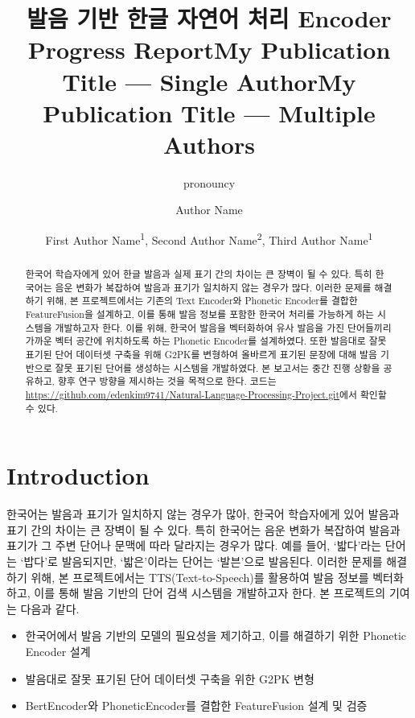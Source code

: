 \documentclass[letterpaper]{article} %
\title{발음 기반 한글 자연어 처리 Encoder \\
        Progress Report}
\author{
    pronouncy
}
\title{My Publication Title --- Single Author}
\author {
    Author Name
}
\title{My Publication Title --- Multiple Authors}
\author {
    First Author Name\textsuperscript{\rm 1},
    Second Author Name\textsuperscript{\rm 2},
    Third Author Name\textsuperscript{\rm 1}
}
\begin{document}
\maketitle

\begin{abstract}
한국어 학습자에게 있어 한글 발음과 실제 표기 간의 차이는 큰 장벽이 될 수 있다. 
특히 한국어는 음운 변화가 복잡하여 발음과 표기가 일치하지 않는 경우가 많다. 이러한 문제를 해결하기 위해, 본 프로젝트에서는 기존의 Text Encoder와 Phonetic Encoder를 결합한 FeatureFusion을 설계하고, 이를 통해 발음 정보를 포함한 한국어 처리를 가능하게 하는 시스템을 개발하고자 한다. 
이를 위해, 한국어 발음을 벡터화하여 유사 발음을 가진 단어들끼리 가까운 벡터 공간에 위치하도록 하는 Phonetic Encoder를 설계하였다. 
또한 발음대로 잘못 표기된 단어 데이터셋 구축을 위해 G2PK\cite{park2019g2pk}를 변형하여 올바르게 표기된 문장에 대해 발음 기반으로 잘못 표기된 단어를 생성하는 시스템을 개발하였다.
본 보고서는 중간 진행 상황을 공유하고, 향후 연구 방향을 제시하는 것을 목적으로 한다. 코드는 \url{https://github.com/edenkim9741/Natural-Language-Processing-Project.git}에서 확인할 수 있다.
\end{abstract}

%

\section{Introduction}
한국어는 발음과 표기가 일치하지 않는 경우가 많아, 한국어 학습자에게 있어 발음과 표기 간의 차이는 큰 장벽이 될 수 있다.
특히 한국어는 음운 변화가 복잡하여 발음과 표기가 그 주변 단어나 문맥에 따라 달라지는 경우가 많다. 예를 들어, `밟다'라는 단어는 `밥다'로 발음되지만, `밟은'이라는 단어는 `발븐'으로 발음된다. 이러한 문제를 해결하기 위해, 본 프로젝트에서는 TTS(Text-to-Speech)를 활용하여 발음 정보를 벡터화하고, 이를 통해 발음 기반의 단어 검색 시스템을 개발하고자 한다.
본 프로젝트의 기여는 다음과 같다.
\begin{itemize}
    \item 한국어에서 발음 기반의 모델의 필요성을 제기하고, 이를 해결하기 위한 Phonetic Encoder 설계
    \item 발음대로 잘못 표기된 단어 데이터셋 구축을 위한 G2PK 변형
    \item BertEncoder와 PhoneticEncoder를 결합한 FeatureFusion 설계 및 검증
\end{itemize}
\end{document}
